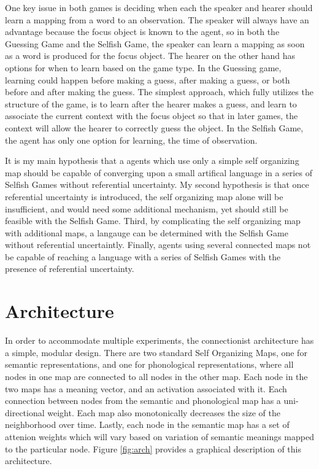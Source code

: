 \documentclass[a4paper,11pt]{article}
\begin{document}
One key issue in both games is deciding when each the speaker and hearer should
learn a mapping from a word to an observation.  The speaker will always have an
advantage because the focus object is known to the agent, so in both the
Guessing Game and the Selfish Game, the speaker can learn a mapping as soon as a
word is produced for the focus object.  The hearer on the other hand has options
for when to learn based on the game type.  In the Guessing game, learning could
happen before making a guess, after making a guess, or both before and after
making the guess.  The simplest approach, which fully utilizes the structure
of the game, is to learn after the hearer makes a guess, and learn to
associate the current context with the focus object so that in later games,
the context will allow the hearer to correctly guess the object. In the
Selfish Game, the agent has only one option for learning, the time of
observation.

It is my main hypothesis that a agents which use only a simple self organizing
map should be capable of converging upon a small artifical language in a series
of Selfish Games without referential uncertainty. My second hypothesis is that
once referential uncertainty is introduced, the self organizing map alone will
be insufficient, and would need some additional mechanism, yet should still be
feasible with the Selfish Game.  Third, by complicating the self organizing map
with additional maps, a langauge can be determined with the Selfish Game without
referential uncertaintly.  Finally, agents using several connected maps not be
capable of reaching a language with a series of Selfish Games with the presence
of referential uncertainty.

\section{Architecture}

In order to accommodate multiple experiments, the connectionist architecture has
a simple, modular design.  There are two standard Self Organizing Maps, one for
semantic representations, and one for phonological representations, where all
nodes in one map are connected to all nodes in the other map.  Each node in
the two maps has a meaning vector, and an activation associated with it.  Each
connection between nodes from the semantic and phonological map has a
uni-directional weight.  Each map also monotonically decreases the size of the
neighborhood over time.  Lastly, each node in the semantic map has a set
of attenion weights which will vary based on variation of semantic meanings
mapped to the particular node.  Figure \ref{fig:arch} provides a graphical
description of this architecture.
\end{document}

